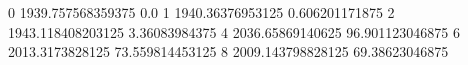0 1939.757568359375 0.0
1 1940.36376953125 0.606201171875
2 1943.118408203125 3.36083984375
4 2036.65869140625 96.901123046875
6 2013.3173828125 73.559814453125
8 2009.143798828125 69.38623046875
